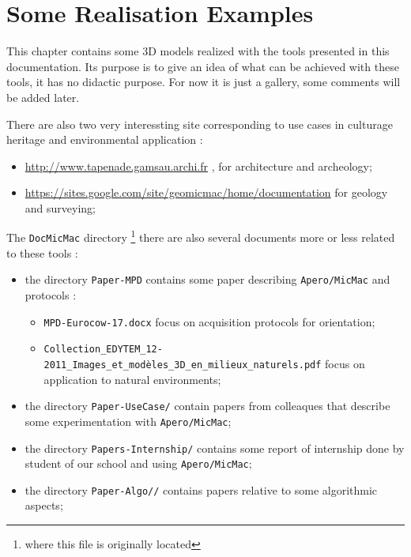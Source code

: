 \chapter{Some Realisation Examples}


This chapter contains some 3D models realized with the tools presented
in this documentation. Its purpose is to give an idea of what can be achieved with these tools, 
it has no didactic purpose.  
For now it is just a gallery, some comments will be added later.

There are also two very interessting site corresponding to use
cases in culturage heritage and environmental application :

\begin{itemize}
   \item \url{http://www.tapenade.gamsau.archi.fr} , for architecture and 
         archeology;

   \item \url{https://sites.google.com/site/geomicmac/home/documentation}
         for geology and surveying;
\end{itemize}

The {\tt DocMicMac} directory \footnote{where this file  is originally located}
there are also several documents more or less related to these tools :

\begin{itemize}
   \item  the directory {\tt Paper-MPD} contains some paper describing {\tt Apero/MicMac}
          and protocols :

          \begin{itemize}
              \item {\tt MPD-Eurocow-17.docx} focus on acquisition protocols for orientation;
              \item {\tt Collection\_EDYTEM\_12-2011\_Images\_et\_modèles\_3D\_en\_milieux\_naturels.pdf} 
                    focus on application to natural environments;
          \end{itemize}

   \item  the directory {\tt Paper-UseCase/} contain papers from colleaques that describe some
          experimentation with {\tt Apero/MicMac};

   \item  the directory {\tt Papers-Internship/} contains some report of internship done
          by student of our school and using {\tt Apero/MicMac};

   \item  the directory {\tt Paper-Algo//} contains papers relative to some algorithmic aspects;
\end{itemize}

